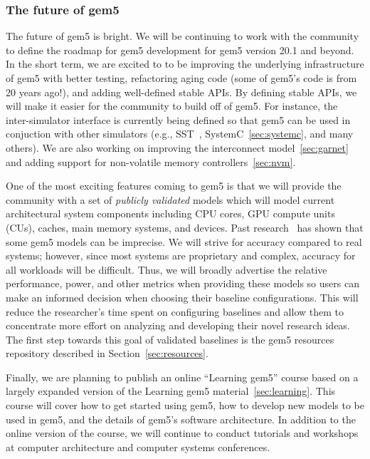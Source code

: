 \subsubsection*{The future of gem5}
The future of gem5 is bright.
We will be continuing to work with the community to define the roadmap for gem5 development for gem5 version 20.1 and beyond.
In the short term, we are excited to to be improving the underlying infrastructure of gem5 with better testing, refactoring aging code (some of gem5's code is from 20 years ago!), and adding well-defined stable APIs.
By defining stable APIs, we will make it easier for the community to build off of gem5.
For instance, the inter-simulator interface is currently being defined so that gem5 can be used in conjuction with other simulators (e.g., SST~\cite{}, SystemC~\ref{sec:systemc}, and many others).
We are also working on improving the interconnect model~\ref{sec:garnet} and adding support for non-volatile memory controllers~\ref{sec:nvm}.

One of the most exciting features coming to gem5 is that we will provide the community with a set of \emph{publicly validated} models which will model current architectural system components including CPU cores, GPU compute units (CUs), caches, main memory systems, and devices.
Past research~\cite{butko2012accuracy, nowatzki2015architectural, endo2014micro, akram201686, asri2016simulator, akram2019validation, gutierrez2014sources, jo2018diagsim, tanimoto2017dependence, walker2018hardware} has shown that some gem5 models can be imprecise.
We will strive for accuracy compared to real systems; however, since most systems are proprietary and complex, accuracy for all workloads will be difficult.
Thus, we will broadly advertise the relative performance, power, and other metrics when providing these models so users can make an informed decision when choosing their baseline configurations.
This will reduce the researcher's time spent on configuring baselines and allow them to concentrate more effort on analyzing and developing their novel research ideas.
The first step towards this goal of validated baselines is the gem5 resources repository described in Section~\ref{sec:resources}.

Finally, we are planning to publish an online ``Learning gem5'' course based on a largely expanded version of the Learning gem5 material~\ref{sec:learning}.
This course will cover how to get started using gem5, how to develop new models to be used in gem5, and the details of gem5's software architecture.
In addition to the online version of the course, we will continue to conduct tutorials and workshops at computer architecture and computer systems conferences.

